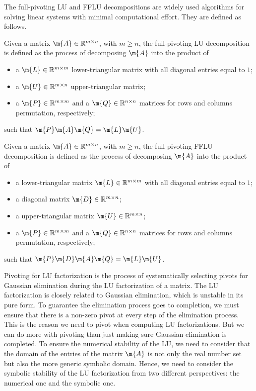 The full-pivoting \ac{LU} and \ac{FFLU} decompositions are widely used algorithms for solving linear systems with minimal computational effort. They are defined as follows.
%
\begin{definition}
  Given a matrix $\m{A} \in \mathbb{R}^{m \times n}$, with $m \geq n$, the full-pivoting \ac{LU} decomposition is defined as the process of decomposing $\m{A}$ into the product of
  \begin{itemize}
    \setlength{\itemsep}{0.0em}
    \item a $\m{L} \in \mathbb{R}^{m \times m}$ lower-triangular matrix with all diagonal entries equal to $1$;
    \item a $\m{U} \in \mathbb{R}^{m \times n}$ upper-triangular matrix;
    \item a $\m{P} \in \mathbb{R}^{m \times m}$ and a $\m{Q} \in \mathbb{R}^{n \times n}$ matrices for rows and columns permutation, respectively;
  \end{itemize}
  such that $\m{P}\m{A}\m{Q} = \m{L}\m{U}$.
\end{definition}
%
\begin{definition}
  Given a matrix $\m{A} \in \mathbb{R}^{m \times n}$, with $m \geq n$, the full-pivoting \ac{FFLU} decomposition is defined as the process of decomposing $\m{A}$ into the product of
  \begin{itemize}
    \setlength{\itemsep}{0.0em}
    \item a lower-triangular matrix $\m{L} \in \mathbb{R}^{m \times m}$ with all diagonal entries equal to $1$;
    \item a diagonal matrix $\m{D} \in \mathbb{R}^{m \times n}$;
    \item a upper-triangular matrix $\m{U} \in \mathbb{R}^{m \times n}$;
    \item a $\m{P} \in \mathbb{R}^{m \times m}$ and a $\m{Q} \in \mathbb{R}^{n \times n}$ matrices for rows and columns permutation, respectively;
  \end{itemize}
  such that $\m{P}\m{D}\m{A}\m{Q} = \m{L}\m{U}$.
\end{definition}
%
Pivoting for \ac{LU} factorization is the process of systematically selecting pivots for Gaussian elimination during the \ac{LU} factorization of a matrix. The \ac{LU} factorization is closely related to Gaussian elimination, which is unstable in its pure form. To guarantee the elimination process goes to completion, we must ensure that there is a non-zero pivot at every step of the elimination process. This is the reason we need to pivot when computing \ac{LU} factorizations. But we can do more with pivoting than just making sure Gaussian elimination is completed. To ensure the numerical stability of the \ac{LU}, we need to consider that the domain of the entries of the matrix $\m{A}$ is not only the real number set but also the more generic symbolic domain. Hence, we need to consider the symbolic stability of the \ac{LU} factorization from two different perspectives: the numerical one and the symbolic one.

